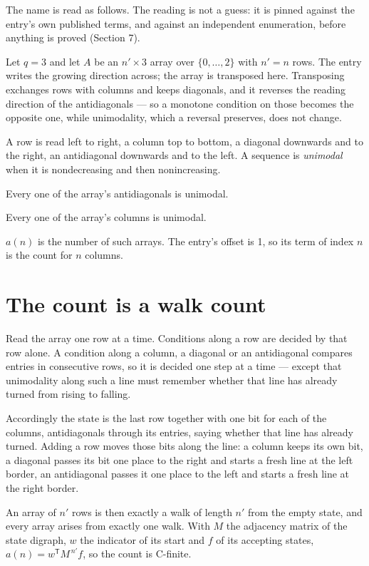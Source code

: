 \documentclass[11pt]{article}
\theoremstyle{definition}
\begin{document}
The name is read as follows. The reading is not a guess: it is pinned against the entry's own published terms, and against an independent enumeration, before anything is proved (Section 7).

Let $q = 3$ and let $A$ be an $n' \times 3$ array over $\{0,\dots,2\}$ with $n' = n$ rows. The entry writes the growing direction across; the array is transposed here. Transposing exchanges rows with columns and keeps diagonals, and it reverses the reading direction of the antidiagonals --- so a monotone condition on those becomes the opposite one, while unimodality, which a reversal preserves, does not change.

A row is read left to right, a column top to bottom, a diagonal downwards and to the right, an antidiagonal downwards and to the left. A sequence is {\itshape unimodal} when it is nondecreasing and then nonincreasing.

Every one of the array's antidiagonals is unimodal.

Every one of the array's columns is unimodal.

$a(n)$ is the number of such arrays. The entry's offset is 1, so its term of index $n$ is the count for $n$ columns.

\section{The count is a walk count}

Read the array one row at a time. Conditions along a row are decided by that row alone. A condition along a column, a diagonal or an antidiagonal compares entries in consecutive rows, so it is decided one step at a time --- except that unimodality along such a line must remember whether that line has already turned from rising to falling.

Accordingly the state is the last row together with one bit for each of the columns, antidiagonals through its entries, saying whether that line has already turned. Adding a row moves those bits along the line: a column keeps its own bit, a diagonal passes its bit one place to the right and starts a fresh line at the left border, an antidiagonal passes it one place to the left and starts a fresh line at the right border.

An array of $n'$ rows is then exactly a walk of length $n'$ from the empty state, and every array arises from exactly one walk. With $M$ the adjacency matrix of the state digraph, $w$ the indicator of its start and $f$ of its accepting states, $a(n) = w^{\mathsf T}M^{\,n'}f$, so the count is C-finite.
\end{document}
